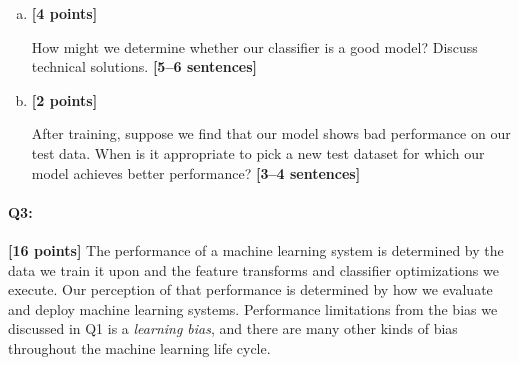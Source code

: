 \begin{enumerate}[(a)]
    \pagebreak
    \item \textbf{[4 points]} 
    \begin{tcolorbox}[colback=orange!5!white,colframe=orange!75!black]
        How might we determine whether our classifier is a good model? Discuss technical solutions. \textbf{[5--6 sentences]}
    \end{tcolorbox}


    \item \textbf{[2 points]}
    \begin{tcolorbox}[colback=orange!5!white,colframe=orange!75!black]
    After training, suppose we find that our model shows bad performance on our test data. 
    When is it appropriate to pick a new test dataset for which our model achieves better performance? \textbf{[3--4 sentences]}
    \end{tcolorbox}


\end{enumerate}


\pagebreak
\paragraph{Q3:} \textbf{[16 points]} The performance of a machine learning system is determined by the data we train it upon and the feature transforms and classifier optimizations we execute. Our perception of that performance is determined by how we evaluate and deploy machine learning systems. Performance limitations from the bias we discussed in Q1 is a \emph{learning bias}, and there are many other kinds of bias throughout the machine learning life cycle.

